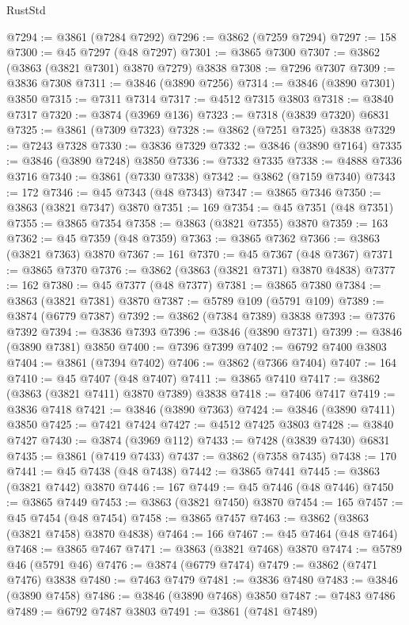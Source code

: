 \begin{lexlean}{RustStd}
\begin{coremodule}
@7294 := @3861 (@7284 @7292)
@7296 := @3862 (@7259 @7294)
@7297 := 158
@7300 := @45 @7297 (@48 @7297)
@7301 := @3865 @7300
@7307 := @3862 (@3863 (@3821 @7301) @3870 @7279) @3838
@7308 := @7296 @7307
@7309 := @3836 @7308
@7311 := @3846 (@3890 @7256)
@7314 := @3846 (@3890 @7301) @3850
@7315 := @7311 @7314
@7317 := @4512 @7315 @3803
@7318 := @3840 @7317
@7320 := @3874 (@3969 @136)
@7323 := @7318 (@3839 @7320) @6831
@7325 := @3861 (@7309 @7323)
@7328 := @3862 (@7251 @7325) @3838
@7329 := @7243 @7328
@7330 := @3836 @7329
@7332 := @3846 (@3890 @7164)
@7335 := @3846 (@3890 @7248) @3850
@7336 := @7332 @7335
@7338 := @4888 @7336 @3716
@7340 := @3861 (@7330 @7338)
@7342 := @3862 (@7159 @7340)
@7343 := 172
@7346 := @45 @7343 (@48 @7343)
@7347 := @3865 @7346
@7350 := @3863 (@3821 @7347) @3870
@7351 := 169
@7354 := @45 @7351 (@48 @7351)
@7355 := @3865 @7354
@7358 := @3863 (@3821 @7355) @3870
@7359 := 163
@7362 := @45 @7359 (@48 @7359)
@7363 := @3865 @7362
@7366 := @3863 (@3821 @7363) @3870
@7367 := 161
@7370 := @45 @7367 (@48 @7367)
@7371 := @3865 @7370
@7376 := @3862 (@3863 (@3821 @7371) @3870 @4838)
@7377 := 162
@7380 := @45 @7377 (@48 @7377)
@7381 := @3865 @7380
@7384 := @3863 (@3821 @7381) @3870
@7387 := @5789 @109 (@5791 @109)
@7389 := @3874 (@6779 @7387)
@7392 := @3862 (@7384 @7389) @3838
@7393 := @7376 @7392
@7394 := @3836 @7393
@7396 := @3846 (@3890 @7371)
@7399 := @3846 (@3890 @7381) @3850
@7400 := @7396 @7399
@7402 := @6792 @7400 @3803
@7404 := @3861 (@7394 @7402)
@7406 := @3862 (@7366 @7404)
@7407 := 164
@7410 := @45 @7407 (@48 @7407)
@7411 := @3865 @7410
@7417 := @3862 (@3863 (@3821 @7411) @3870 @7389) @3838
@7418 := @7406 @7417
@7419 := @3836 @7418
@7421 := @3846 (@3890 @7363)
@7424 := @3846 (@3890 @7411) @3850
@7425 := @7421 @7424
@7427 := @4512 @7425 @3803
@7428 := @3840 @7427
@7430 := @3874 (@3969 @112)
@7433 := @7428 (@3839 @7430) @6831
@7435 := @3861 (@7419 @7433)
@7437 := @3862 (@7358 @7435)
@7438 := 170
@7441 := @45 @7438 (@48 @7438)
@7442 := @3865 @7441
@7445 := @3863 (@3821 @7442) @3870
@7446 := 167
@7449 := @45 @7446 (@48 @7446)
@7450 := @3865 @7449
@7453 := @3863 (@3821 @7450) @3870
@7454 := 165
@7457 := @45 @7454 (@48 @7454)
@7458 := @3865 @7457
@7463 := @3862 (@3863 (@3821 @7458) @3870 @4838)
@7464 := 166
@7467 := @45 @7464 (@48 @7464)
@7468 := @3865 @7467
@7471 := @3863 (@3821 @7468) @3870
@7474 := @5789 @46 (@5791 @46)
@7476 := @3874 (@6779 @7474)
@7479 := @3862 (@7471 @7476) @3838
@7480 := @7463 @7479
@7481 := @3836 @7480
@7483 := @3846 (@3890 @7458)
@7486 := @3846 (@3890 @7468) @3850
@7487 := @7483 @7486
@7489 := @6792 @7487 @3803
@7491 := @3861 (@7481 @7489)

\end{coremodule}
\end{lexlean}
